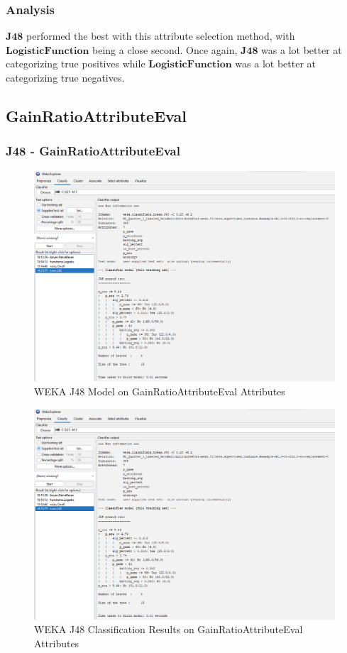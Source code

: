 \documentclass[12pt]{article}
\begin{document}
\newpage
\subsubsection{Analysis}
$\textbf{J48}$ performed the best with this attribute selection method, with $\textbf{LogisticFunction}$ being a close second. Once again, $\textbf{J48}$ was a lot better at categorizing true positives while $\textbf{LogisticFunction}$ was a lot better at categorizing true negatives. 


\newpage
\subsection{GainRatioAttributeEval}

\subsubsection{J48 - GainRatioAttributeEval}
\begin{figure}[h!]
    \includegraphics[scale=0.4]{./images/GainRatioAttributeEval/J48-Model.png}
\centering
    \caption{WEKA J48 Model on GainRatioAttributeEval Attributes}
\end{figure}
\newpage
\begin{figure}[h!]
    \includegraphics[scale=0.4]{./images/GainRatioAttributeEval/J48-Model.png}
\centering
    \caption{WEKA J48 Classification Results on GainRatioAttributeEval Attributes}
\end{figure}
\end{document}
